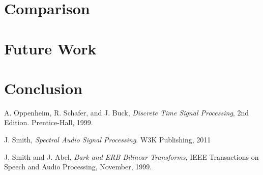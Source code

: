 \documentclass[journal]{IEEEtran}
\begin{document}
\section{Comparison}
\section{Future Work}
\section{Conclusion}
\begin{thebibliography}{1}
A. Oppenheim, R. Schafer, and J. Buck, \emph{Discrete Time Signal Processing}, 2nd Edition. Prentice-Hall, 1999.

J. Smith, \emph{Spectral Audio Signal Processing}. W3K Publishing, 2011

J. Smith and J. Abel, \emph{Bark and ERB Bilinear Transforms}, IEEE Transactions on Speech and Audio Processing, November, 1999.
\end{thebibliography}






\end{document}
